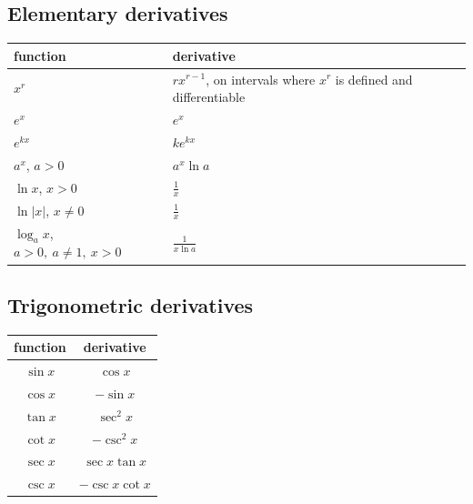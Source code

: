 \subsection{Elementary derivatives}
\label{appsubsec:elementary-derivatives}

\begin{center}
\renewcommand{\arraystretch}{1.9}
\begin{tabular}{p{}|p{}}
\textbf{function} & \textbf{derivative} \\ \hline

\(\displaystyle x^r\) &
\(\displaystyle r x^{r-1}\), on intervals where \(x^r\) is defined and differentiable \\

\(\displaystyle e^x\) &
\(\displaystyle e^x\) \\

\(\displaystyle e^{kx}\) &
\(\displaystyle k e^{kx}\) \\

\(\displaystyle a^x\), \(a>0\) &
\(\displaystyle a^x\ln a\) \\

\(\displaystyle \ln x\), \(x>0\) &
\(\displaystyle \frac1x\) \\

\(\displaystyle \ln|x|\), \(x\neq0\) &
\(\displaystyle \frac1x\) \\

\(\displaystyle \log_a x\), \(a>0,\ a\neq1,\ x>0\) &
\(\displaystyle \frac1{x\ln a}\)
\end{tabular}
\end{center}

\subsection{Trigonometric derivatives}
\label{appsubsec:trigonometric-derivatives}

\begin{center}
\renewcommand{\arraystretch}{1.8}
\begin{tabular}{c|c}
\textbf{function} & \textbf{derivative} \\ \hline
\(\sin x\) & \(\cos x\) \\
\(\cos x\) & \(-\sin x\) \\
\(\tan x\) & \(\sec^2 x\) \\
\(\cot x\) & \(-\csc^2 x\) \\
\(\sec x\) & \(\sec x\tan x\) \\
\(\csc x\) & \(-\csc x\cot x\)
\end{tabular}
\end{center}

